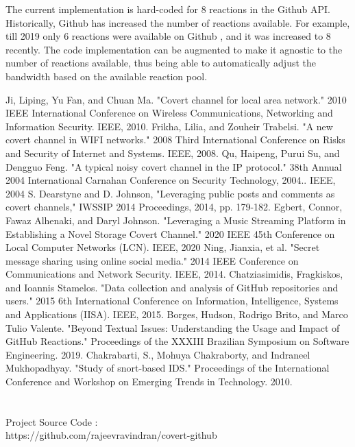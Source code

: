 \documentclass[conference]{IEEEtran}
\begin{document}
The current implementation is hard-coded for 8 reactions in the Github API. Historically, Github has increased the number of reactions available. For example, till 2019 only 6 reactions were available on Github \cite{b8}, and it was increased to 8 recently. The code implementation can be augmented to make it agnostic to the number of reactions available, thus being able to automatically adjust the bandwidth based on the available reaction pool.

\begin{thebibliography}{00}
Ji, Liping, Yu Fan, and Chuan Ma. "Covert channel for local area network." 2010 IEEE International Conference on Wireless Communications, Networking and Information Security. IEEE, 2010. 
 Frikha, Lilia, and Zouheir Trabelsi. "A new covert channel in WIFI networks." 2008 Third International Conference on Risks and Security of Internet and Systems. IEEE, 2008.
 Qu, Haipeng, Purui Su, and Dengguo Feng. "A typical noisy covert channel in the IP protocol." 38th Annual 2004 International Carnahan Conference on Security Technology, 2004.. IEEE, 2004
 S. Dearstyne and D. Johnson, "Leveraging public posts and comments as covert channels," IWSSIP 2014 Proceedings, 2014, pp. 179-182.
 Egbert, Connor, Fawaz Alhenaki, and Daryl Johnson. "Leveraging a Music Streaming Platform in Establishing a Novel Storage Covert Channel." 2020 IEEE 45th Conference on Local Computer Networks (LCN). IEEE, 2020
 Ning, Jianxia, et al. "Secret message sharing using online social media." 2014 IEEE Conference on Communications and Network Security. IEEE, 2014.
Chatziasimidis, Fragkiskos, and Ioannis Stamelos. "Data collection and analysis of GitHub repositories and users." 2015 6th International Conference on Information, Intelligence, Systems and Applications (IISA). IEEE, 2015.
Borges, Hudson, Rodrigo Brito, and Marco Tulio Valente. "Beyond Textual Issues: Understanding the Usage and Impact of GitHub Reactions." Proceedings of the XXXIII Brazilian Symposium on Software Engineering. 2019.
 Chakrabarti, S., Mohuya Chakraborty, and Indraneel Mukhopadhyay. "Study of snort-based IDS." Proceedings of the International Conference and Workshop on Emerging Trends in Technology. 2010.
\end{thebibliography}

\appendix
\section{}
Project Source Code : \\
https://github.com/rajeevravindran/covert-github
\end{document}
